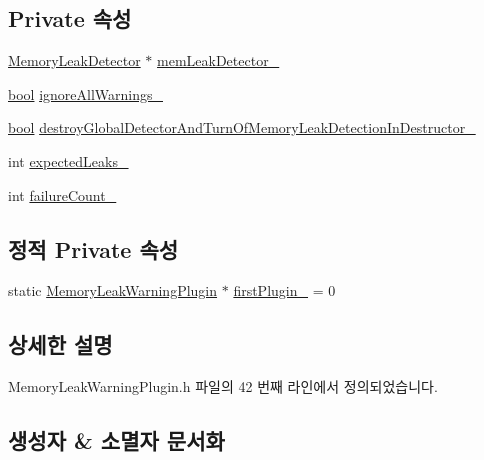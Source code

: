 \subsection*{Private 속성}
\begin{DoxyCompactItemize}
\item 
\hyperlink{class_memory_leak_detector}{Memory\+Leak\+Detector} $\ast$ \hyperlink{class_memory_leak_warning_plugin_afe143d17de3accfcf9be8c7d476e26fa}{mem\+Leak\+Detector\+\_\+}
\item 
\hyperlink{avb__gptp_8h_af6a258d8f3ee5206d682d799316314b1}{bool} \hyperlink{class_memory_leak_warning_plugin_ab3c6236220c0602b50a621c5d7fbda34}{ignore\+All\+Warnings\+\_\+}
\item 
\hyperlink{avb__gptp_8h_af6a258d8f3ee5206d682d799316314b1}{bool} \hyperlink{class_memory_leak_warning_plugin_a790e256fbe7d8f5660bc2ff7fcea4fb2}{destroy\+Global\+Detector\+And\+Turn\+Of\+Memory\+Leak\+Detection\+In\+Destructor\+\_\+}
\item 
int \hyperlink{class_memory_leak_warning_plugin_a7d18a67c3be157258b86787ef367d540}{expected\+Leaks\+\_\+}
\item 
int \hyperlink{class_memory_leak_warning_plugin_a006a6550e4e3d4de173c35b50c1c90b0}{failure\+Count\+\_\+}
\end{DoxyCompactItemize}
\subsection*{정적 Private 속성}
\begin{DoxyCompactItemize}
\item 
static \hyperlink{class_memory_leak_warning_plugin}{Memory\+Leak\+Warning\+Plugin} $\ast$ \hyperlink{class_memory_leak_warning_plugin_a92d0d74dd3b19744fe0d91a7fb1b3840}{first\+Plugin\+\_\+} = 0
\end{DoxyCompactItemize}


\subsection{상세한 설명}


Memory\+Leak\+Warning\+Plugin.\+h 파일의 42 번째 라인에서 정의되었습니다.



\subsection{생성자 \& 소멸자 문서화}

